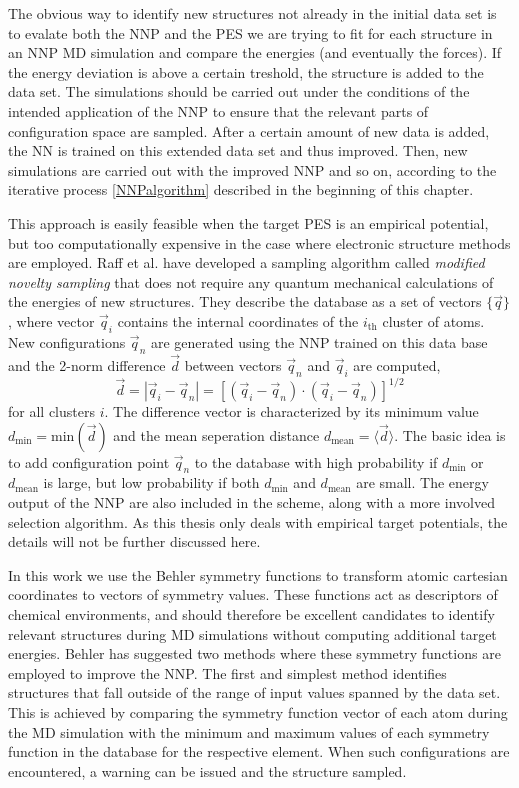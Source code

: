 \documentclass[twoside,english]{uiofysmaster}
\begin{document}
The obvious way to identify new structures not already in the initial data set is to evalate both the NNP and 
the PES we are trying to fit for each structure in an NNP MD simulation and compare the energies (and eventually 
the forces). If the energy deviation is above a certain treshold, the structure is added to the data set.
The simulations should be carried out under the conditions of the intended application of the NNP to ensure
that the relevant parts of configuration space are sampled.
After a certain amount of new data is added, 
the NN is trained on this extended data set and thus improved. Then, new simulations are carried out with the improved
NNP and so on, according to the iterative process \autoref{NNPalgorithm} described in the beginning of this chapter. 

This approach is easily feasible when the target PES is an empirical potential, but too computationally expensive 
in the case where electronic structure methods are employed. Raff et al. \cite{Raff05} have developed a sampling
algorithm called \textit{modified novelty sampling} that does not require any quantum mechanical calculations of
the energies of new structures. They describe the database as a set of vectors $\{\vec{q}\}$, where vector
$\vec{q}_i$ contains the internal coordinates of the $i_\textrm{th}$ cluster of atoms. New configurations
$\vec{q}_n$ are generated using the NNP trained on this data base and the 2-norm difference $\vec{d}$ between vectors
$\vec{q}_n$ and $\vec{q}_i$ are computed,
\begin{equation}
 \vec{d} = | \vec{q}_i - \vec{q}_n | = 
 \left[(\vec{q}_i - \vec{q}_n)\cdot(\vec{q}_i - \vec{q}_n)\right]^{1/2}
\end{equation}
for all clusters $i$. The difference vector is characterized by its minimum value $d_\textrm{min} = \textrm{min}(\vec{d})$ and 
the mean seperation distance $d_\textrm{mean} = \langle\vec{d}\rangle$. 
The basic idea is to add configuration point $\vec{q}_n$ to the database with high
probability if $d_\textrm{min}$ or $d_\textrm{mean}$ is large, but low probability if both 
$d_\textrm{min}$ and $d_\textrm{mean}$ are small. The energy output of the NNP are also included in the scheme, along with
a more involved selection algorithm. As this thesis only deals with empirical target potentials, the details will
not be further discussed here. 

In this work we use the Behler symmetry functions to transform atomic cartesian coordinates to vectors of symmetry values.
These functions act as descriptors of chemical environments, and should therefore be excellent candidates
to identify relevant structures during MD simulations without computing additional target energies. 
Behler has suggested two methods \cite{Behler11general} where these symmetry functions are employed to improve the NNP. 
The first and simplest method identifies structures that fall outside of the range of input values spanned by the data set. 
This is achieved by comparing the symmetry function vector of each atom during the MD simulation with 
the minimum and maximum values of each symmetry function in the database for the respective element. 
When such configurations are encountered, a warning can be issued and the structure sampled.  
\end{document}

